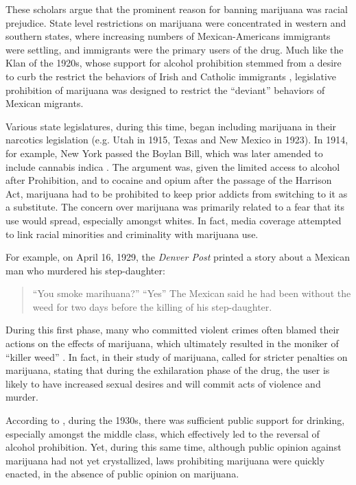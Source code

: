 These scholars argue that the prominent reason for banning marijuana was racial prejudice. State level restrictions on marijuana were concentrated in western and southern states, where increasing numbers of Mexican-Americans immigrants were settling, and immigrants were the primary users of the drug. Much like the Klan of the 1920s, whose support for alcohol prohibition stemmed from a desire to curb the restrict the behaviors of Irish and Catholic immigrants \citep{mcveigh_2009,andrews_and_seguin_2015}, legislative prohibition of marijuana was designed to restrict the ``deviant'' behaviors of Mexican migrants.

Various state legislatures, during this time, began including marijuana in their narcotics legislation (e.g. Utah in 1915, Texas and New Mexico in 1923). In 1914, for example, New York passed the Boylan Bill, which was later amended to include cannabis indica \citep{nyt_1914}. The argument was, given the limited access to alcohol after Prohibition, and to cocaine and opium after the passage of the Harrison Act, marijuana had to be prohibited to keep prior addicts from switching to it as a substitute. The concern over marijuana was primarily related to a fear that its use would spread, especially amongst whites. In fact, media coverage attempted to link racial minorities and criminality with marijuana use. 


For example, on April 16, 1929, the \textit{Denver Post} printed a story about a Mexican man who murdered his step-daughter:

\begin{quotation}
\noindent ``You smoke marihuana?'' \newline
\noindent ``Yes'' \newline
\noindent  The Mexican said he had been without the weed for two days before the killing of his step-daughter.
\end{quotation}

During this first phase, many who committed violent crimes often blamed their actions on the effects of marijuana, which ultimately resulted in the moniker of ``killer weed'' \citep{rusby_et_al_1930}. In fact, in their study of marijuana, \citet{hayes_and_bowery_1933} called for stricter penalties on marijuana, stating that during the exhilaration phase of the drug, the user is likely to have increased sexual desires and will commit acts of violence and murder.

According to \citet{bonnie_and_whitebread_1970}, during the 1930s, there was sufficient public support for drinking, especially amongst the middle class, which effectively led to the reversal of alcohol prohibition. Yet, during this same time, although public opinion against marijuana had not yet crystallized, laws prohibiting marijuana were quickly enacted, in the absence of public opinion on marijuana. 


